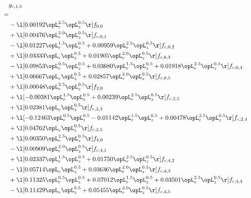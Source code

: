 \begin{alignat}{2} 
\label{eq:g_15_0} 
& g_{c,1,5} \nonumber \\ 
 = \\ 
& - \l[  0.00192 \opL_r^{2.5} \opL_z^{0.5}  \r] f_{0,0} \nonumber \\ 
& + \l[  0.00476 \opL_r^{2.0} \opL_z^{0.5}  \r] f_{c,0,1} \nonumber \\ 
& - \l[  0.01227 \opL_r^{1.5} \opL_z^{0.5} +  0.00959 \opL_r^{2.5} \opL_z^{0.5}  \r] f_{c,0,2} \nonumber \\ 
& + \l[  0.03333 \opL_r \opL_z^{0.5} +  0.01905 \opL_r^{2.0} \opL_z^{0.5}  \r] f_{c,0,3} \nonumber \\ 
& - \l[  0.09853 \opL_r^{0.5} \opL_z^{0.5} +  0.03680 \opL_r^{1.5} \opL_z^{0.5} +  0.01918 \opL_r^{2.5} \opL_z^{0.5}  \r] f_{c,0,4} \nonumber \\ 
& + \l[  0.06667 \opL_r \opL_z^{0.5} +  0.02857 \opL_r^{2.0} \opL_z^{0.5}  \r] f_{c,0,5} \nonumber \\ 
& + \l[  0.00048 \opL_r^{2.5} \opL_z^{0.5}  \r] f_{2,0} \nonumber \\ 
& + \l[  -0.00381 \opL_r^{1.5} \opL_z^{0.5} +  0.00239 \opL_r^{2.5} \opL_z^{0.5}  \r] f_{c,2,2} \nonumber \\ 
& + \l[  0.02381 \opL_r \opL_z^{0.5}  \r] f_{c,2,3} \nonumber \\ 
& + \l[  -0.12463 \opL_r^{0.5} \opL_z^{0.5}   -0.01142 \opL_r^{1.5} \opL_z^{0.5} +  0.00478 \opL_r^{2.5} \opL_z^{0.5}  \r] f_{c,2,4} \nonumber \\ 
& + \l[  0.04762 \opL_r \opL_z^{0.5}  \r] f_{c,2,5} \nonumber \\ 
& + \l[  0.00350 \opL_r^{2.5} \opL_z^{0.5}  \r] f_{4,0} \nonumber \\ 
& - \l[  0.00909 \opL_r^{2.0} \opL_z^{0.5}  \r] f_{c,4,1} \nonumber \\ 
& + \l[  0.02337 \opL_r^{1.5} \opL_z^{0.5} +  0.01750 \opL_r^{2.5} \opL_z^{0.5}  \r] f_{c,4,2} \nonumber \\ 
& - \l[  0.05714 \opL_r \opL_z^{0.5} +  0.03636 \opL_r^{2.0} \opL_z^{0.5}  \r] f_{c,4,3} \nonumber \\ 
& + \l[  0.11325 \opL_r^{0.5} \opL_z^{0.5} +  0.07012 \opL_r^{1.5} \opL_z^{0.5} +  0.03501 \opL_r^{2.5} \opL_z^{0.5}  \r] f_{c,4,4} \nonumber \\ 
& - \l[  0.11429 \opL_r \opL_z^{0.5} +  0.05455 \opL_r^{2.0} \opL_z^{0.5}  \r] f_{c,4,5} \nonumber \\ 
\end{alignat} 


